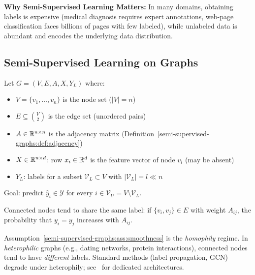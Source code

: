 \begin{notechapter}
\begin{insightbox}
\textbf{Why Semi-Supervised Learning Matters:}
In many domains, obtaining labels is expensive (medical diagnosis requires
expert annotations, web-page classification faces billions of pages with few
labeled), while unlabeled data is abundant and encodes the underlying data
distribution.
\end{insightbox}

\subsection{Semi-Supervised Learning on Graphs}

\begin{definition}
\label{semi-supervised-graphs:def:ssl_graph}
Let $G = (V, E, A, X, Y_L)$ where:
\begin{itemize}
    \item $V = \{v_1, \ldots, v_n\}$ is the node set ($|V|=n$)
    \item $E \subseteq \binom{V}{2}$ is the edge set (unordered pairs)
    \item $A \in \mathbb{R}^{n \times n}$ is the adjacency matrix
      (Definition~\ref{semi-supervised-graphs:def:adjacency})
    \item $X \in \mathbb{R}^{n \times d}$: row $x_i \in \mathbb{R}^d$ is the feature vector
      of node $v_i$ (may be absent)
    \item $Y_L$: labels for a subset $\mathcal{V}_L \subset V$ with
      $|\mathcal{V}_L| = l \ll n$
\end{itemize}
Goal: predict $\hat{y}_i \in \mathcal{Y}$ for every $i \in \mathcal{V}_U =
V \setminus \mathcal{V}_L$.
\end{definition}

\begin{assumption}
\label{semi-supervised-graphs:ass:smoothness}
Connected nodes tend to share the same label: if $\{v_i, v_j\} \in E$ with
weight $A_{ij}$, the probability that $y_i = y_j$ increases with $A_{ij}$.
\end{assumption}

\begin{remark}
\label{semi-supervised-graphs:rem:heterophily}
Assumption~\ref{semi-supervised-graphs:ass:smoothness} is the \emph{homophily} regime. In
\emph{heterophilic} graphs (e.g., dating networks, protein interactions),
connected nodes tend to have \emph{different} labels. Standard methods (label
propagation, GCN) degrade under heterophily; see~\cite{semi-supervised-graphs:zhu2020beyond,semi-supervised-graphs:lim2021large} for dedicated architectures.
\end{remark}


\end{notechapter}
